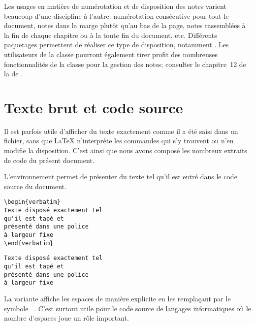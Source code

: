 Les usages en matière de numérotation et de disposition des notes
varient beaucoup d'une discipline à l'autre: numérotation consécutive
pour tout le document, notes dans la marge plutôt qu'au bas de la
page, notes rassemblées à la fin de chaque chapitre ou à la toute fin
du document, etc. Différents paquetages permettent de réaliser ce type
de disposition, notamment  \citep{footmisc}. Les
utilisateurs de la classe  pourront également tirer
profit des nombreuses fonctionnalités de la classe  pour
la gestion des notes; consulter le chapitre~12 de la %
 de .


\section{Texte brut et code source}
\label{sec::apparence:code}

Il est parfois utile d'afficher du texte exactement comme il a été
saisi dans un fichier, sans que {\LaTeX} n'interprète les commandes
qui s'y trouvent ou n'en modifie la disposition. C'est ainsi que nous
avons composé les nombreux extraits de code du présent document.

L'environnement  permet de présenter du texte tel qu'il
est entré dans le code source du document.
\begin{demo}
  \begin{texample}
\begin{lstlisting}
\begin{verbatim}
Texte disposé exactement tel
qu'il est tapé et
présenté dans une police
à largeur fixe
\end{verbatim}
\end{lstlisting}
    \producing
\begin{verbatim}
Texte disposé exactement tel
qu'il est tapé et
présenté dans une police
à largeur fixe
\end{verbatim}
\end{texample}
\end{demo}
La variante  affiche les espaces de manière explicite en
les remplaçant par le symbole \verb*| |. C'est surtout utile pour le
code source de langages informatiques où le nombre d'espaces joue un rôle
important.

